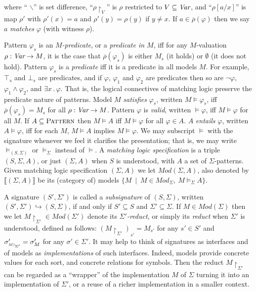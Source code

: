 \documentclass[UTF8,11pt]{article}
\theoremstyle{plain}
\theoremstyle{definition}
\theoremstyle{remark}
\newcommand{\Mod}{\textit{Mod}}
\newcommand{\denote}[1]{\llbracket{#1}\rrbracket}
\newcommand{\reduct}[2]{\mbox{${#1}\!\!\upharpoonright_{#2}$}}
\newcommand{\reductscript}[2]{\mbox{\tiny${#1}\!\!\upharpoonright_{#2}$}}
\newcommand{\Pattern}{\textsc{Pattern}\xspace}
\begin{document}
where `` $\backslash$'' is set difference,
``$\rho\!\!\upharpoonright_V$'' is
$\rho$ restricted to $V \subseteq \textit{Var}$,
and ``$\rho[a/x]$'' is map $\rho'$ with $\rho'(x)=a$ and $\rho'(y)=\rho(y)$ if
$y\neq x$.
If $a\in \overline{\rho}(\varphi)$ then we say $a$ \emph{matches}
$\varphi$ (with witness $\rho$).

Pattern $\varphi_s$ is an \emph{$M$-predicate}, or a
\emph{predicate in $M$}, iff for any $M$-valuation $\rho:\textit{Var}\rightarrow M$,
it is the case that $\overline{\rho}(\varphi_s)$ is either $M_s$ (it holds) or
$\emptyset$ (it does not hold).
Pattern $\varphi_s$ is a \emph{predicate} iff it is a predicate in all
models $M$.
For example, $\top_s$ and $\bot_s$ are predicates, and if $\varphi$,
$\varphi_1$ and $\varphi_2$ are predicates then so are $\neg\varphi$,
$\varphi_1 \wedge \varphi_2$, and $\exists x\,.\,\varphi$.
That is, the logical connectives of matching logic preserve the predicate
nature of patterns.
Model $M$ \emph{satisfies} $\varphi_s$, written ${M}\models \varphi_s$, iff
$\overline{\rho}(\varphi_s) = M_s$ for all $\rho:\textit{Var}\rightarrow M$.
Pattern $\varphi$ is \emph{valid}, written $\models \varphi$,
iff ${M} \models \varphi$ for all ${M}$.
If $A\subseteq\Pattern$ then ${M} \models A$ iff
${M} \models \varphi$ for all $\varphi\in A$.
$A$ \emph{entails} $\varphi$, written $A \models \varphi$,
iff for each ${M}$, ${M} \models A$ implies ${M} \models \varphi$.
We may subscript $\models$ with the signature whenever we feel it
clarifies the presentation; that is, we may write $\models_{(S,\Sigma)}$ or
$\models_\Sigma$ instead of $\models$.
A \emph{matching logic specification} is a triple $(S,\Sigma,A)$, or
just $(\Sigma,A)$ when $S$ is understood, with $A$ a set of $\Sigma$-patterns.
Given matching logic specification $(\Sigma,A)$ we let
$\Mod(\Sigma,A)$, also denoted by $\denote{(\Sigma,A)}$ be its (category of)
models $\{M \ \mid \ M \in \Mod_{\Sigma},\ M \models_{\Sigma} A \}$.

A signature $(S',\Sigma')$ is called a \emph{subsignature} of $(S,\Sigma)$, written
$(S',\Sigma') \hookrightarrow(S,\Sigma)$, if and only if $S' \subseteq S$ and
$\Sigma' \subseteq \Sigma$.
If $M \in \Mod(\Sigma)$ then we let
$\reduct{M}{\Sigma'} \in \Mod(\Sigma')$ denote its
\emph{$\Sigma'$-reduct}, or simply its \emph{reduct} when
$\Sigma'$ is understood, defined as follows:
$(\reduct{M}{\Sigma'})_{s'} = M_{s'}$ for any $s'\in S'$ and
$\sigma'_{\reductscript{M}{\Sigma'}} = \sigma'_M$ for any $\sigma'\in\Sigma'$.
It may help to think of signatures as interfaces and of models as
\emph{implementations} of such interfaces.
Indeed, models provide concrete values for each sort, and concrete relations
for symbols.
Then the reduct $\reduct{M}{\Sigma'}$ can be regarded as a ``wrapper'' of
the implementation $M$ of $\Sigma$ turning it into an implementation of
$\Sigma'$, or a reuse of a richer implementation in a smaller context.
\end{document}

